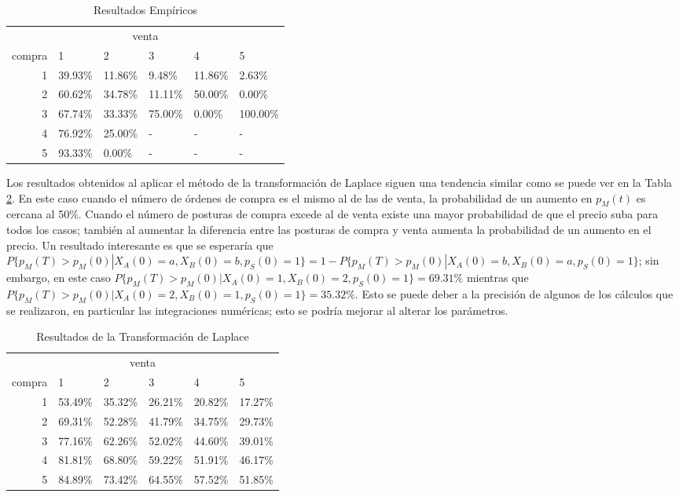 \documentclass[11pt]{article}
\numberwithin{equation}{section} %
\begin{document}
\begin{table}[htbp]
\centering
\caption{Resultados Empíricos}
\begin{tabular}{r|p{1.5cm}|p{1.5cm}|p{1.5cm}|p{1.5cm}|p{1.5cm}|}
\multicolumn{6}{c}{venta}\\
\cline{2-6}
compra & 1& 2 & 3 & 4 & 5 \\
\cline{2-6}
1 & 39.93\% & 11.86\% & 9.48\% & 11.86\% & 2.63\% \\
2 & 60.62\% & 34.78\% & 11.11\% & 50.00\% & 0.00\% \\
3 & 67.74\% & 33.33\% & 75.00\% & 0.00\% & 100.00\% \\
4 & 76.92\% & 25.00\% & - & - & - \\
5 & 93.33\% & 0.00\% & - & - & - \\
\cline{2-6}
\end{tabular}%
\label{tab:resempirca}%
\end{table}%

Los resultados obtenidos al aplicar el método de la transformación de Laplace siguen una tendencia similar como se puede ver en la Tabla \ref{tab:reslaplace}. En este caso cuando el número de órdenes de compra es el mismo al de las de venta, la probabilidad de un aumento en $p_M(t)$ es cercana al 50\%. Cuando el número de posturas de compra excede al de venta existe una mayor probabilidad de que el precio suba para todos los casos; también al aumentar la diferencia entre las posturas de compra y venta aumenta la probabilidad de un aumento en el precio. Un resultado interesante es que se esperaría que $P\{p_M(T)>p_M(0)|X_A(0)=a,X_B(0)=b,p_S(0)=1\}=1-P\{p_M(T)>p_M(0)|X_A(0)=b,X_B(0)=a,p_S(0)=1\}$; sin embargo, en este caso $P\{p_M(T)>p_M(0)|X_A(0)=1,X_B(0)=2,p_S(0)=1\}=69.31\%$ mientras que $P\{p_M(T)>p_M(0)|X_A(0)=2,X_B(0)=1,p_S(0)=1\}=35.32\%$. Esto se puede deber a la precisión de algunos de los cálculos que se realizaron, en particular las integraciones numéricas; esto se podría mejorar al alterar los parámetros.

\begin{table}[htbp]
\centering
\caption{Resultados de la Transformación de Laplace}
\begin{tabular}{r|p{1.5cm}|p{1.5cm}|p{1.5cm}|p{1.5cm}|p{1.5cm}|}
\multicolumn{6}{c}{venta}\\
\cline{2-6}
compra & 1& 2 & 3 & 4 & 5 \\
\cline{2-6}
1 & 53.49\% & 35.32\% & 26.21\% & 20.82\% & 17.27\% \\
2 & 69.31\% & 52.28\% & 41.79\% & 34.75\% & 29.73\% \\
3 & 77.16\% & 62.26\% & 52.02\% & 44.60\% & 39.01\% \\
4 & 81.81\% & 68.80\% & 59.22\% & 51.91\% & 46.17\% \\
5 & 84.89\% & 73.42\% & 64.55\% & 57.52\% & 51.85\% \\
\cline{2-6}
\end{tabular}%
\label{tab:reslaplace}%
\end{table}%
\end{document}
